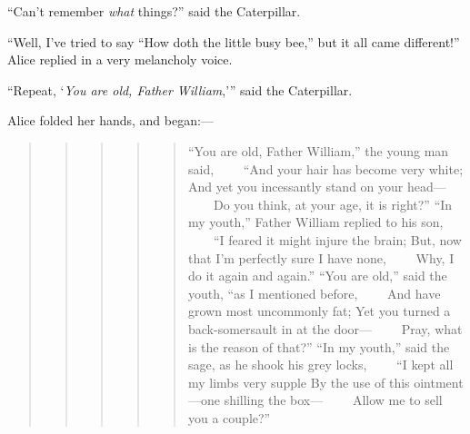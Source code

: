 \documentclass[11pt,openany,oneside]{book}
\begin{document}
“Can’t remember {\em what\/} things?” said the Caterpillar. 

“Well, I’ve tried to say “How doth the little busy bee,” but it all came different!” Alice replied in a very melancholy voice. 

“Repeat, ‘{\em You are old, Father William\/},’” said the Caterpillar. 

Alice folded her hands, and began:— 

\begin{quote}
\begin{quote}
\begin{quote}
\begin{quote}
\begin{quote}
{\small “You are old, Father William,” the young man said,}\newline
{\small  ~~~~“And your hair has become very white;}\newline
{\small  And yet you incessantly stand on your head—}\newline
{\small  ~~~~Do you think, at your age, it is right?”}\newline
{\small  }\newline
{\small  “In my youth,” Father William replied to his son,}\newline
{\small  ~~~~“I feared it might injure the brain;}\newline
{\small  But, now that I’m perfectly sure I have none,}\newline
{\small  ~~~~Why, I do it again and again.”}\newline
{\small  }\newline
{\small  “You are old,” said the youth, “as I mentioned before,}\newline
{\small  ~~~~And have grown most uncommonly fat;}\newline
{\small  Yet you turned a back-somersault in at the door—}\newline
{\small  ~~~~Pray, what is the reason of that?”}\newline
{\small  }\newline
{\small  “In my youth,” said the sage, as he shook his grey locks,}\newline
{\small  ~~~~“I kept all my limbs very supple}\newline
{\small  By the use of this ointment—one shilling the box—}\newline
{\small  ~~~~Allow me to sell you a couple?”}\newline
{\small  }\newline

\end{quote}
\end{quote}
\end{quote}
\end{quote}
\end{quote}
\end{document}
